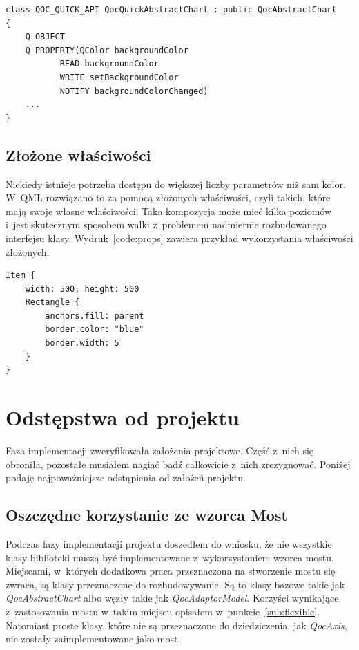 \begin{lstlisting}[caption=Adapter klasy QocAbstractChart, label=code:qoc:adapter]
class QOC_QUICK_API QocQuickAbstractChart : public QocAbstractChart
{
	Q_OBJECT
	Q_PROPERTY(QColor backgroundColor 
		   READ backgroundColor 
		   WRITE setBackgroundColor 
		   NOTIFY backgroundColorChanged)
	...
}
\end{lstlisting}

\subsection{Złożone właściwości}
Niekiedy istnieje potrzeba dostępu do większej liczby parametrów niż sam kolor. W~QML rozwiązano to za pomocą złożonych właściwości, czyli takich, które mają swoje własne właściwości. Taka kompozycja może mieć kilka poziomów i~jest skutecznym sposobem walki z~problemem nadmiernie rozbudowanego interfejsu klasy. Wydruk~\ref{code:props} zawiera przykład wykorzystania właściwości złożonych.

\begin{lstlisting}[caption=Właściwości złożone w QML, label=code:props]
Item {
    width: 500; height: 500
    Rectangle {
        anchors.fill: parent
        border.color: "blue"
        border.width: 5
    }
}
\end{lstlisting}


\section{Odstępstwa od projektu}
Faza implementacji zweryfikowała założenia projektowe. Część z~nich się obroniła, pozostałe musiałem nagiąć bądź całkowicie z~nich zrezygnować. Poniżej podaję najpoważniejsze odstąpienia od założeń projektu.

\subsection{Oszczędne korzystanie ze wzorca Most}
Podczas fazy implementacji projektu doszedłem do wniosku, że nie wszystkie klasy biblioteki muszą być implementowane z~wykorzystaniem wzorca mostu. Miejscami, w~których dodatkowa praca przeznaczona na stworzenie mostu się zwraca, są klasy przeznaczone do rozbudowywanie. Są to klasy bazowe takie jak \textit{QocAbstractChart} albo węzły takie jak \textit{QocAdaptorModel}. Korzyści wynikające z~zastosowania mostu w~takim miejscu opisałem w~punkcie~\ref{sub:flexible}. Natomiast proste klasy, które nie są przeznaczone do dziedziczenia, jak \textit{QocAxis}, nie zostały zaimplementowane jako most.


